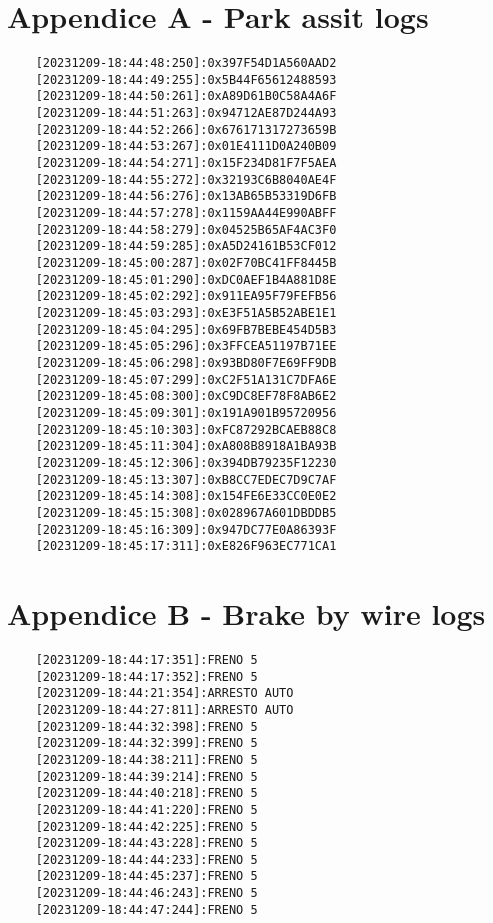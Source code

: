 \documentclass[12pt]{article}
\begin{document}
\section{Appendice A - Park assit logs}
\begin{verbatim}
    [20231209-18:44:48:250]:0x397F54D1A560AAD2
    [20231209-18:44:49:255]:0x5B44F65612488593
    [20231209-18:44:50:261]:0xA89D61B0C58A4A6F
    [20231209-18:44:51:263]:0x94712AE87D244A93
    [20231209-18:44:52:266]:0x676171317273659B
    [20231209-18:44:53:267]:0x01E4111D0A240B09
    [20231209-18:44:54:271]:0x15F234D81F7F5AEA
    [20231209-18:44:55:272]:0x32193C6B8040AE4F
    [20231209-18:44:56:276]:0x13AB65B53319D6FB
    [20231209-18:44:57:278]:0x1159AA44E990ABFF
    [20231209-18:44:58:279]:0x04525B65AF4AC3F0
    [20231209-18:44:59:285]:0xA5D24161B53CF012
    [20231209-18:45:00:287]:0x02F70BC41FF8445B
    [20231209-18:45:01:290]:0xDC0AEF1B4A881D8E
    [20231209-18:45:02:292]:0x911EA95F79FEFB56
    [20231209-18:45:03:293]:0xE3F51A5B52ABE1E1
    [20231209-18:45:04:295]:0x69FB7BEBE454D5B3
    [20231209-18:45:05:296]:0x3FFCEA51197B71EE
    [20231209-18:45:06:298]:0x93BD80F7E69FF9DB
    [20231209-18:45:07:299]:0xC2F51A131C7DFA6E
    [20231209-18:45:08:300]:0xC9DC8EF78F8AB6E2
    [20231209-18:45:09:301]:0x191A901B95720956
    [20231209-18:45:10:303]:0xFC87292BCAEB88C8
    [20231209-18:45:11:304]:0xA808B8918A1BA93B
    [20231209-18:45:12:306]:0x394DB79235F12230
    [20231209-18:45:13:307]:0xB8CC7EDEC7D9C7AF
    [20231209-18:45:14:308]:0x154FE6E33CC0E0E2
    [20231209-18:45:15:308]:0x028967A601DBDDB5
    [20231209-18:45:16:309]:0x947DC77E0A86393F
    [20231209-18:45:17:311]:0xE826F963EC771CA1
\end{verbatim}

\section{Appendice B - Brake by wire logs}
\begin{verbatim}
    [20231209-18:44:17:351]:FRENO 5
    [20231209-18:44:17:352]:FRENO 5
    [20231209-18:44:21:354]:ARRESTO AUTO
    [20231209-18:44:27:811]:ARRESTO AUTO
    [20231209-18:44:32:398]:FRENO 5
    [20231209-18:44:32:399]:FRENO 5
    [20231209-18:44:38:211]:FRENO 5
    [20231209-18:44:39:214]:FRENO 5
    [20231209-18:44:40:218]:FRENO 5
    [20231209-18:44:41:220]:FRENO 5
    [20231209-18:44:42:225]:FRENO 5
    [20231209-18:44:43:228]:FRENO 5
    [20231209-18:44:44:233]:FRENO 5
    [20231209-18:44:45:237]:FRENO 5
    [20231209-18:44:46:243]:FRENO 5
    [20231209-18:44:47:244]:FRENO 5
\end{verbatim}
\end{document}
